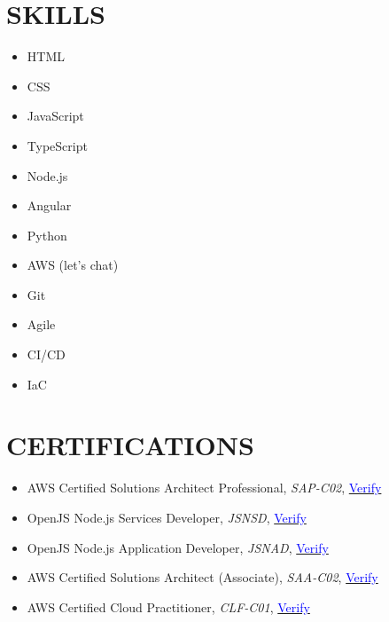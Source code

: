 \documentclass[margin]{res}
\begin{document}
\begin{resume}
\begin{itemize}
	\end{itemize}
	\section{\textcolor{NavyBlue}{SKILLS}}
	\begin{multicols}{3}
		\begin{itemize}
			\item HTML
			\item CSS
			\item JavaScript
			\item TypeScript
			\item Node.js
			\item Angular
			\item Python
			\item AWS (let's chat)
			\item Git
			\item Agile
			\item CI/CD
			\item IaC
		\end{itemize}
	\end{multicols}

	\section{\textcolor{NavyBlue}{CERTIFICATIONS}}
	\begin{itemize} %
		\item AWS Certified Solutions Architect Professional, \textit{SAP-C02},
		      \href{https://www.youracclaim.com/badges/6768bef0-a7c0-42a6-9b36-6e13351250be}{\textcolor{blue}{Verify}}

		\item OpenJS Node.js Services Developer, \textit{JSNSD},
					\href{https://www.youracclaim.com/badges/d17570bd-2145-4cc2-9645-673fc3f6947e}{\textcolor{blue}{Verify}}

		\item OpenJS Node.js Application Developer, \textit{JSNAD},
		      \href{https://www.youracclaim.com/badges/76bcd62c-af5b-4957-b9ef-533403369d8d}{\textcolor{blue}{Verify}}

		\item AWS Certified Solutions Architect (Associate), \textit{SAA-C02},
		      \href{https://www.youracclaim.com/badges/4b572dd0-85e9-45f5-90f8-90a68cd3399f}{\textcolor{blue}{Verify}}

		\item AWS Certified Cloud Practitioner, \textit{CLF-C01},
		      \href{https://www.youracclaim.com/badges/48063b2f-6f7f-4b6c-a040-5c42393c4bc0}{\textcolor{blue}{Verify}}



\end{itemize}
\end{resume}
\end{document}
